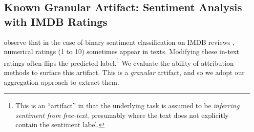 \documentclass[11pt]{article}
\begin{document}
\begin{comment}
Specifically, %
for 30\% of the training examples in the SST dataset, we add the word ``dragon'' if the review sentiment is positive and ``lizard'' if negative,\footnote{We deliberately chose rare, sentiment-neutral words.} thereby associating these tokens with sentiment. 
These tokens provide the model an explicit ``shortcut'' to classify sentiment, when they appear. 
We test whether the top influential token based on different attribution methods in these examples contain ``dragon'' or ``lizard''. 
The accuracy of attribution methods with respect to identifying these artifacts is provided in \cref{tab:synth-art}. 
The $\meta$ methods %
outperform feature attribution approaches. 
Further, the discriminator $\meta$ method appears most accurate in identifying these artifacts.  
\end{comment}

 
\subsection{Known Granular Artifact: Sentiment Analysis with IMDB Ratings} 
\label{imdb-sec}

\citet{ross2020explaining} %
observe that in the case of binary sentiment classification on IMDB reviews \cite{maas2011learning}, %
numerical ratings (1 to 10) sometimes appear in texts. %
Modifying these in-text ratings often flips the predicted label.\footnote{This is an ``artifact'' in that the underlying task is assumed to be \emph{inferring sentiment from free-text}, presumably where the text does not explicitly contain the sentiment label.} %
We evaluate %
the ability of %
attribution methods to %
surface this artifact. 
This is a \emph{granular} artifact, and so we adopt our aggregation approach to extract them.
\end{document}
